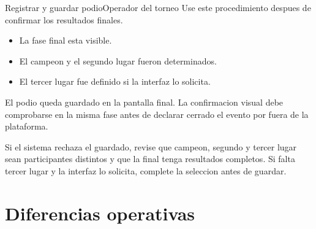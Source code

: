\begin{procedimiento}{Registrar y guardar podio}{Operador del torneo}
Use este procedimiento despues de confirmar los resultados finales.
\end{procedimiento}

\begin{precondiciones}
\begin{itemize}
    \item La fase final esta visible.
    \item El campeon y el segundo lugar fueron determinados.
    \item El tercer lugar fue definido si la interfaz lo solicita.
\end{itemize}
\end{precondiciones}


\begin{resultadoesperado}
El podio queda guardado en la pantalla final. La confirmacion visual debe comprobarse en la misma fase antes de declarar cerrado el evento por fuera de la plataforma.
\end{resultadoesperado}

\begin{fallas}
Si el sistema rechaza el guardado, revise que campeon, segundo y tercer lugar sean participantes distintos y que la final tenga resultados completos. Si falta tercer lugar y la interfaz lo solicita, complete la seleccion antes de guardar.
\end{fallas}

\section{Diferencias operativas}

